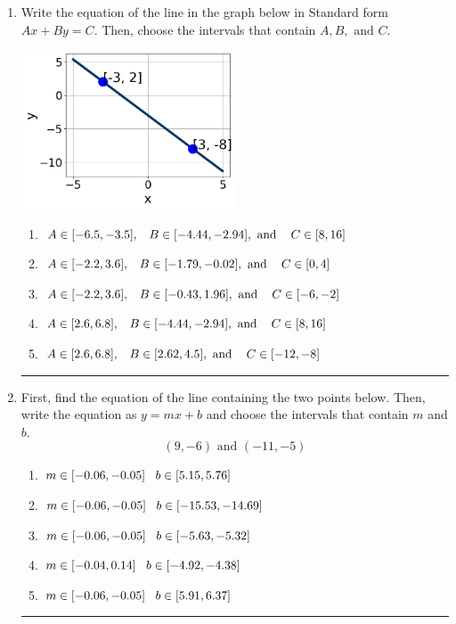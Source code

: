 \documentclass[14pt]{extbook}
\newcommand{\litem}[1]{\item#1\hspace*{-1cm}\rule{\textwidth}{0.4pt}}
\begin{document}
\begin{enumerate}
{\begin{enumerate}[label=\Alph*.]
\end{enumerate} }
\litem{
Write the equation of the line in the graph below in Standard form $Ax+By=C$. Then, choose the intervals that contain $A, B, \text{ and } C$.
\begin{center}
    \includegraphics[width=0.5\textwidth]{../Figures/linearGraphToStandardA.png}
\end{center}
\begin{enumerate}[label=\Alph*.]
\item \( A \in [-6.5, -3.5], \hspace{3mm} B \in [-4.44, -2.94], \text{ and } \hspace{3mm} C \in [8, 16] \)
\item \( A \in [-2.2, 3.6], \hspace{3mm} B \in [-1.79, -0.02], \text{ and } \hspace{3mm} C \in [0, 4] \)
\item \( A \in [-2.2, 3.6], \hspace{3mm} B \in [-0.43, 1.96], \text{ and } \hspace{3mm} C \in [-6, -2] \)
\item \( A \in [2.6, 6.8], \hspace{3mm} B \in [-4.44, -2.94], \text{ and } \hspace{3mm} C \in [8, 16] \)
\item \( A \in [2.6, 6.8], \hspace{3mm} B \in [2.62, 4.5], \text{ and } \hspace{3mm} C \in [-12, -8] \)

\end{enumerate} }
\litem{
First, find the equation of the line containing the two points below. Then, write the equation as $ y=mx+b $ and choose the intervals that contain $m$ and $b$.\[ (9, -6) \text{ and } (-11, -5) \]\begin{enumerate}[label=\Alph*.]
\item \( m \in [-0.06, -0.05] \hspace*{3mm} b \in [5.15, 5.76] \)
\item \( m \in [-0.06, -0.05] \hspace*{3mm} b \in [-15.53, -14.69] \)
\item \( m \in [-0.06, -0.05] \hspace*{3mm} b \in [-5.63, -5.32] \)
\item \( m \in [-0.04, 0.14] \hspace*{3mm} b \in [-4.92, -4.38] \)
\item \( m \in [-0.06, -0.05] \hspace*{3mm} b \in [5.91, 6.37] \)


\end{enumerate}}
\end{enumerate}
\end{document}
